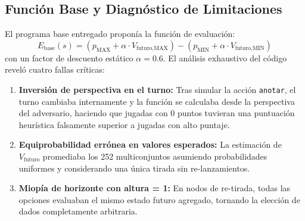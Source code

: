 \documentclass[10pt, a4paper]{article}
\begin{document}
\subsection{Función Base y Diagnóstico de Limitaciones}
El programa base entregado proponía la función de evaluación:
\begin{equation}
E_{\text{base}}(s) = (p_{\text{MAX}} + \alpha \cdot V_{\text{futuro,MAX}}) - (p_{\text{MIN}} + \alpha \cdot V_{\text{futuro,MIN}})
\label{eq:base_cacho}
\end{equation}
con un factor de descuento estático $\alpha = 0.6$. El análisis exhaustivo del código reveló cuatro fallas críticas:
\begin{enumerate}
    \item \textbf{Inversión de perspectiva en el turno:} Tras simular la acción \texttt{anotar}, el turno cambiaba internamente y la función se calculaba desde la perspectiva del adversario, haciendo que jugadas con 0 puntos tuvieran una puntuación heurística falsamente superior a jugadas con alto puntaje.
    \item \textbf{Equiprobabilidad errónea en valores esperados:} La estimación de $V_{\text{futuro}}$ promediaba los 252 multiconjuntos asumiendo probabilidades uniformes y considerando una única tirada sin re-lanzamientos.
    \item \textbf{Miopía de horizonte con altura = 1:} En nodos de re-tirada, todas las opciones evaluaban el mismo estado futuro agregado, tornando la elección de dados completamente arbitraria.
\end{enumerate}
\end{document}
